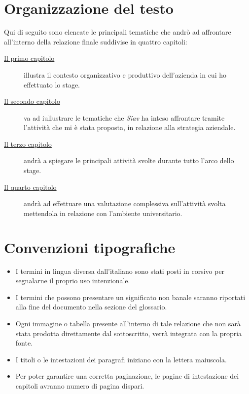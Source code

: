 \section*{Organizzazione del testo}
Qui di seguito sono elencate le principali tematiche che andrò ad affrontare all'interno della relazione finale suddivise in quattro capitoli:
\begin{description}
	\item[{\hyperref[cap:il-contesto-aziendale]{Il primo capitolo}}] illustra il contesto organizzativo e produttivo dell'azienda in cui ho effettuato lo stage. 
	\item[{\hyperref[cap:stage interno della strategia aziendale]{Il secondo capitolo}}] va ad iullustrare le tematiche che \textit{Siav} ha inteso affrontare tramite l'attività che mi è stata proposta, in relazione alla strategia aziendale.
	\item[{\hyperref[cap:Resoconto dello stage]{Il terzo capitolo}}] andrà a spiegare le principali attività svolte durante tutto l'arco dello stage.
	\item[{\hyperref[cap:valutazione-retrospettiva]{Il quarto capitolo}}] andrà ad effettuare una valutazione complessiva sull'attività svolta mettendola in relazione con l'ambiente universitario.
\end{description}
\newpage
\section*{Convenzioni tipografiche}
\begin{itemize}
	\item{I termini in lingua diversa dall'italiano sono stati posti in corsivo per segnalarne il proprio uso intenzionale.}
	\item { I termini che possono presentare un significato non banale saranno riportati alla fine del documento nella sezione del glossario.}
	\item {Ogni immagine o tabella presente all'interno di tale relazione che non sarà stata prodotta direttamente dal sottoscritto, verrà integrata con la propria fonte.}
	\item {I titoli o le intestazioni dei paragrafi iniziano con la lettera maiuscola.}
	\item {Per poter garantire una corretta paginazione, le pagine di intestazione dei capitoli avranno numero di pagina dispari.}
	
\end{itemize}

%
%

\endgroup			

\vfill

